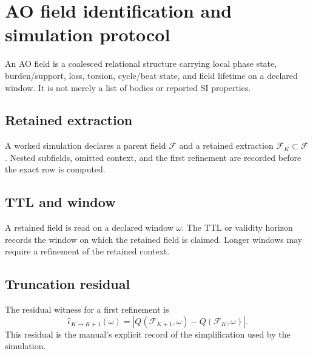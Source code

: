 \section{AO field identification and simulation protocol}
\label{app:manual-ao-field-protocol}

An AO field is a coalesced relational structure carrying local phase state, burden/support, loss, torsion, cycle/beat state, and field lifetime on a declared window. It is not merely a list of bodies or reported SI properties.

\subsection{Retained extraction}
A worked simulation declares a parent field \(\mathcal F\) and a retained extraction \(\mathcal F_K\subset\mathcal F\). Nested subfields, omitted context, and the first refinement are recorded before the exact row is computed.

\subsection{TTL and window}
A retained field is read on a declared window \(\omega\). The TTL or validity horizon records the window on which the retained field is claimed. Longer windows may require a refinement of the retained context.

\subsection{Truncation residual}
The residual witness for a first refinement is
\[
\widehat\epsilon_{K\to K+1}(\omega)
=
\left|
Q(\mathcal F_{K+1},\omega)-Q(\mathcal F_K,\omega)
\right|.
\]
This residual is the manual's explicit record of the simplification used by the simulation.
